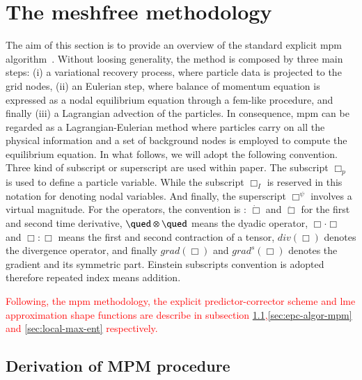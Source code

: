 \documentclass[preprint,12pt,a4paper]{elsarticle}
\newcommand{\red}[1]{
  \textcolor{red}{{#1}}
}
\newcommand{\Div}[1]{
  \ensuremath{div({#1})}
}
\newcommand\Grad[1]{grad({#1})}
\newcommand\GradS[1]{grad^s({#1})}
\begin{document}
\section{The meshfree methodology}
\label{sec:meshfree-methodology}

The aim of this section is to provide an overview of the standard
explicit \acrshort{mpm} algorithm~\cite{Sulsky1994}. Without loosing
generality, the method is composed by three main steps: (i) a
variational recovery process, where particle data is projected to the
grid nodes, (ii) an Eulerian step, where balance of momentum equation
is expressed as a nodal equilibrium equation through a \acrshort{fem}-like
procedure, and finally (iii) a Lagrangian advection of the
particles. In consequence, \acrshort{mpm} can be regarded as a
Lagrangian-Eulerian method where particles carry on all the physical
information and a set of background nodes is employed to
compute the equilibrium equation. In what follows, we will adopt the
following convention. Three kind of subscript or superscript are used
within paper. The subscript $\Box_p$ is used to define a particle
variable. While the subscript $\Box_I$ is reserved in this notation for denoting nodal
variables. And finally, the superscript $\Box^{\psi}$ involves a
virtual magnitude. For the operators, the convention is : $\dot{\Box}$ and
$\ddot{\Box}$ for the first and second time derivative, $\qued \otimes
\qued$ means the dyadic operator, $\Box \cdot \Box$ and $\Box \colon \Box$ means the
first and second contraction of a tensor, $\Div{\Box}$ denotes the
divergence operator, and finally $\Grad{\Box}$ and $\GradS{\Box}$
denotes the gradient and its symmetric part. Einstein subscripts
convention is adopted therefore repeated index means addition.  

\red{Following, the \acrshort{mpm} methodology, the explicit predictor-corrector scheme and \acrshort{lme} approximation shape functions are describe in subsection \ref{sec:derivation-mpm},\ref{sec:epc-algor-mpm} and \ref{sec:local-max-ent} respectively.}

\subsection{Derivation of MPM procedure}
\label{sec:derivation-mpm}
\end{document}
